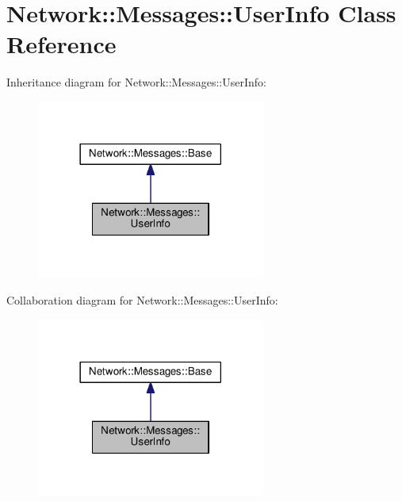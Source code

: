 \hypertarget{class_network_1_1_messages_1_1_user_info}{}\section{Network\+:\+:Messages\+:\+:User\+Info Class Reference}
\label{class_network_1_1_messages_1_1_user_info}


Inheritance diagram for Network\+:\+:Messages\+:\+:User\+Info\+:
\nopagebreak
\begin{figure}[H]
\begin{center}
\leavevmode
\includegraphics[width=213pt]{class_network_1_1_messages_1_1_user_info__inherit__graph}
\end{center}
\end{figure}


Collaboration diagram for Network\+:\+:Messages\+:\+:User\+Info\+:
\nopagebreak
\begin{figure}[H]
\begin{center}
\leavevmode
\includegraphics[width=213pt]{class_network_1_1_messages_1_1_user_info__coll__graph}
\end{center}
\end{figure}
